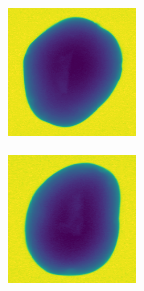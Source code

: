 \documentclass[11pt]{article}
\begin{document}
\begin{figure}[!h]
\begin{subfigure}[b]{0.22\textwidth}
         \caption{}
         \label{fig:hollow_9}
     \end{subfigure}
     \hfill
     \begin{subfigure}[b]{0.22\textwidth}
         \centering
         \includegraphics[width=\textwidth]{figurer/potato_dataset/hollow/hollow_10.jpg}
         \caption{}
         \label{fig:hollow_10}
     \end{subfigure}
     \hfill
     \begin{subfigure}[b]{0.22\textwidth}
         \centering
         \includegraphics[width=\textwidth]{figurer/potato_dataset/hollow/hollow_11.jpg}

\end{subfigure}
\end{figure}
\end{document}
